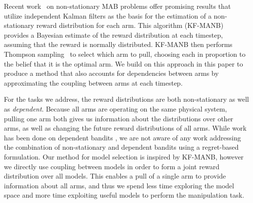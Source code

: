 Recent work~\cite{Granmo2010} on non-stationary \ac{MAB} problems offer promising results that utilize independent Kalman filters as the basis for the estimation of a non-stationary reward distribution for each arm. This algorithm (KF-MANB) provides a Bayesian estimate of the reward distribution at each timestep, assuming that the reward is normally distributed. KF-MANB then performs Thompson sampling~\cite{Agrawal2012} to select which arm to pull, choosing each in proportion to the belief that it is the optimal arm. We build on this approach in this paper to produce a method that also accounts for dependencies between arms by approximating the coupling between arms at each timestep.

For the tasks we address, the reward distributions are both non-stationary as well as \textit{dependent}. Because all arms are operating on the same physical system, pulling one arm both gives us information about the distributions over other arms, as well as changing the future reward distributions of all arms. While work has been done on dependent bandits \cite{Pandey2007,Langford2008}, we are not aware of any work addressing the combination of non-stationary and dependent bandits using a regret-based formulation. Our method for model selection is inspired by KF-MANB, however we directly use coupling between models in order to form a joint reward distribution over all models. This enables a pull of a single arm to provide information about all arms, and thus we spend less time exploring the model space and more time exploiting useful models to perform the manipulation task.